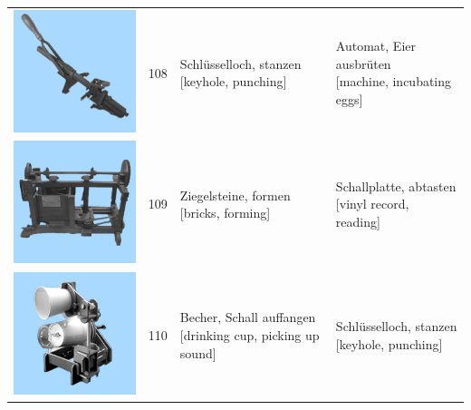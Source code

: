 \documentclass[
  english,
  doc,12pt,twoside,floatsintext]{apa7}
\begin{document}
\begin{center}
\begin{ThreePartTable}
{\begin{longtable}{llll}
\includegraphics[valign=c, scale=0.23]{../materials/unfamiliar/108.png} & 108 & \makecell[l]{Schlüsselloch, stanzen\\{[keyhole, punching]}} & \makecell[l]{Automat, Eier ausbrüten\\{[machine, incubating eggs]}}\\
\includegraphics[valign=c, scale=0.23]{../materials/unfamiliar/109.png} & 109 & \makecell[l]{Ziegelsteine, formen\\{[bricks, forming]}} & \makecell[l]{Schallplatte, abtasten\\{[vinyl record, reading]}}\\
\includegraphics[valign=c, scale=0.23]{../materials/unfamiliar/110.png} & 110 & \makecell[l]{Becher, Schall auffangen\\{[drinking cup, picking up sound]}} & \makecell[l]{Schlüsselloch, stanzen\\{[keyhole, punching]}}\\

\end{longtable}}
\end{ThreePartTable}
\end{center}
\end{document}
